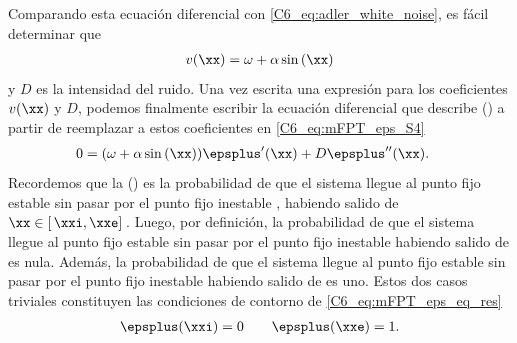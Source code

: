 {\begin{equation}
\end{equation}
Comparando esta ecuación diferencial con \ref{C6_eq:adler_white_noise}, es fácil determinar que 
\begin{align}
    v(\xx) = \omega + \alpha \sin{(\xx)}  \label{C6_eq:mFPT_eps_def_vD_solved}
\end{align}
y $D$ es la intensidad del ruido. Una vez escrita una expresión para los coeficientes $v(\xx)$ y $D$, podemos finalmente escribir la ecuación diferencial que describe \epsplus(\xx) a partir de reemplazar a estos coeficientes en \ref{C6_eq:mFPT_eps_S4}
\begin{align}
     0 &=  (\omega + \alpha \sin{(\xx)}) \epsplus'(\xx) + D \epsplus''(\xx) .
     \label{C6_eq:mFPT_eps_eq_res}
\end{align}
Recordemos que la \epsplus(\xx) es la probabilidad de que el sistema llegue al punto fijo estable \xxe sin pasar por el punto fijo inestable \xxi, habiendo salido de $ \xx  \in [ \,\xxi,\xxe ]\,$. Luego, por definición, la probabilidad de que el sistema llegue al punto fijo estable \xxe sin pasar por el punto fijo inestable \xxi habiendo salido de \xxi es nula. Además, la probabilidad de que el sistema llegue al punto fijo estable \xxe sin pasar por el punto fijo inestable \xxi habiendo salido de \xxe es uno. Estos dos casos triviales constituyen las condiciones de contorno de \ref{C6_eq:mFPT_eps_eq_res}
\begin{align}
    \epsplus(\xxi) = 0 \qquad \epsplus(\xxe) = 1.
    \label{C6_eq:mFPT_eps_cdc}
\end{align}


}
